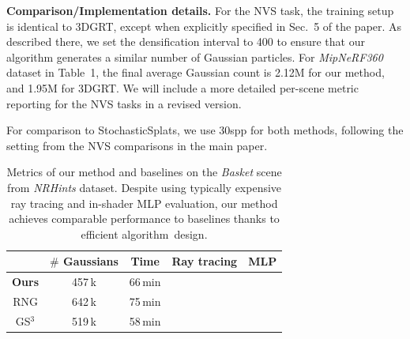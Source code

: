 \documentclass[10pt,twocolumn,letterpaper]{article}
\newcommand{\myparagraph}[1]{\noindent\textbf{#1}}
\newcommand{\MyCheck}{\color{Green}{\cmark}}
\newcommand{\MyCross}{\color{Red}{\xmark}}
\begin{document}
\myparagraph{Comparison/Implementation details.}
%
%
%
For the NVS task, the training setup is identical to 3DGRT, except when explicitly specified in Sec.~5 of the paper. As described there, we set the densification interval to 400 to ensure that our algorithm generates a similar number of Gaussian particles. For \textsl{MipNeRF360} dataset in Table~1, the final average Gaussian count is 2.12M for our method, and 1.95M for 3DGRT. We will include a more detailed per-scene metric reporting for the NVS tasks in a revised version.

For comparison to StochasticSplats, we use 30spp for both methods, following the setting from the NVS comparisons in the main paper.


\begin{table}[t]
    \caption{\label{tab:relightable_metrics}
        Metrics of our method and baselines on the \textsl{Basket} scene from \textsl{NRHints} dataset. Despite using typically expensive ray tracing and in-shader MLP evaluation, our method achieves comparable performance to baselines thanks to efficient algorithm~design.
    }
    \centering
    \small
    \begin{tabular}{c|cccc}
        \toprule
         & $\#$ \textbf{Gaussians} & \textbf{Time} & \textbf{Ray tracing} & \textbf{MLP} \\
        \midrule
        \textbf{Ours} & 457\,k & 66\,min & \MyCheck & \MyCheck \\
        RNG & 642\,k & 75\,min & \MyCross & \MyCheck \\
        GS$^3$ & 519\,k & 58\,min & \MyCross & \MyCross \\
        \bottomrule
    \end{tabular}
\end{table}
\end{document}
